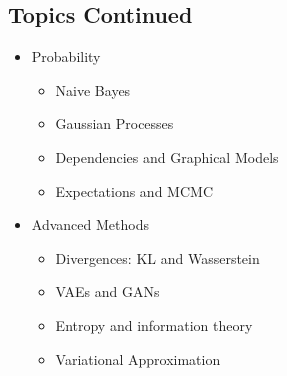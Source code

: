 \begin{slide}
\section{Topics Continued}

\begin{PauseHighLight}
  \begin{itemize}
  \item Probability
    \begin{itemize}
    \item Naive Bayes
    \item Gaussian Processes
    \item Dependencies and Graphical Models
    \item Expectations and MCMC\pause
    \end{itemize}
  \item Advanced Methods
    \begin{itemize}
    \item Divergences: KL and Wasserstein
    \item VAEs and GANs
    \item Entropy and information theory
    \item Variational Approximation\pause
    \end{itemize}
  \end{itemize}
\end{PauseHighLight}

\end{slide}




